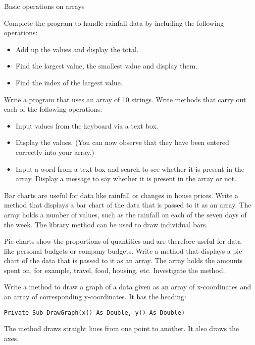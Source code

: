 			Basic operations on arrays
			\begin{EXE}
			\item	{} Complete the program to handle rainfall data by including the following operations:
					\begin{itemize}
			      \item Add up the values and display the total.
			      \item Find the largest value, the smallest value and display them.
     			 	\item Find the index of the largest value.
					\end{itemize}
				\item	{} Write a program that uses an array of 10 strings. Write methods that carry out each of the following operations:
					\begin{itemize}
						\item Input values from the keyboard via a text box.
			      \item Display the values. (You can now observe that they have been entered correctly into your array.)
      			\item Input a word from a text box and search to see whether it is present in the array. Display a message to say whether it is present in the array or not.
					\end{itemize}
				\item	{} Bar charts are useful for data like rainfall or changes in house prices. Write a method that displays a bar chart of the data that is passed to it as an array. The array holds a number of values, such as the rainfall on each of the seven days of the week. The library method  can be used to draw individual bars.
				\item	{} Pie charts show the proportions of quantities and are therefore useful for data like personal budgets or company budgets. Write a method that displays a pie chart of the data that is passed to it as an array. The array holds the amounts spent on, for example, travel, food, housing, etc. Investigate the  method.
				\item	{} Write a method to draw a graph of a data given as an array of x-coordinates and an array of corresponding y-coordinates. It has the heading:
					\begin{lstlisting}
Private Sub DrawGraph(x() As Double, y() As Double)
					\end{lstlisting}
					The method draws straight lines from one point to another. It also draws the axes.
			\end{EXE}

